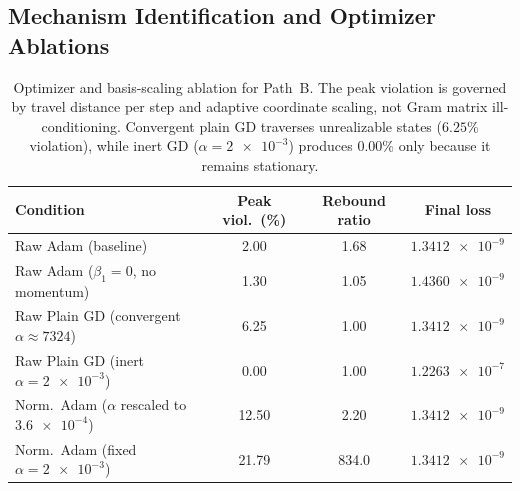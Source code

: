 \documentclass[preprint,aps,prb,longbibliography,superscriptaddress]{revtex4-2}
\begin{document}
\subsection{Mechanism Identification and Optimizer Ablations}
\label{sec:mechanism}

\begin{table}[t]
\caption{Optimizer and basis-scaling ablation for Path~B.
  The peak violation is governed by travel distance per step and adaptive
  coordinate scaling, not Gram matrix ill-conditioning. Convergent plain GD
  traverses unrealizable states ($6.25\%$ violation), while inert GD
  ($\alpha = \num{2e-3}$) produces $0.00\%$ only because it remains stationary.}\label{tab:ablation}
\begin{ruledtabular}
\begin{tabular}{lS[table-format=2.2]S[table-format=3.1]c}
  Condition & {Peak viol.\ (\%)} & {Rebound ratio\footnotemark[1]} & Final loss \\
  \midrule
  Raw Adam (baseline) & 2.00 & 1.68 & $\num{1.3412e-9}$ \\
  Raw Adam ($\beta_1 = 0$, no momentum) & 1.30 & 1.05 & $\num{1.4360e-9}$ \\
  Raw Plain GD (convergent $\alpha \approx 7324$) & 6.25 & 1.00 & $\num{1.3412e-9}$ \\
  Raw Plain GD (inert $\alpha = \num{2e-3}$) & 0.00 & 1.00 & $\num{1.2263e-7}$ \\
  Norm.\ Adam ($\alpha$ rescaled to $\num{3.6e-4}$) & 12.50 & 2.20 & $\num{1.3412e-9}$ \\
  Norm.\ Adam (fixed $\alpha = \num{2e-3}$) & 21.79 & 834.0 & $\num{1.3412e-9}$ \\
\end{tabular}
\end{ruledtabular}
\end{table}
\end{document}
